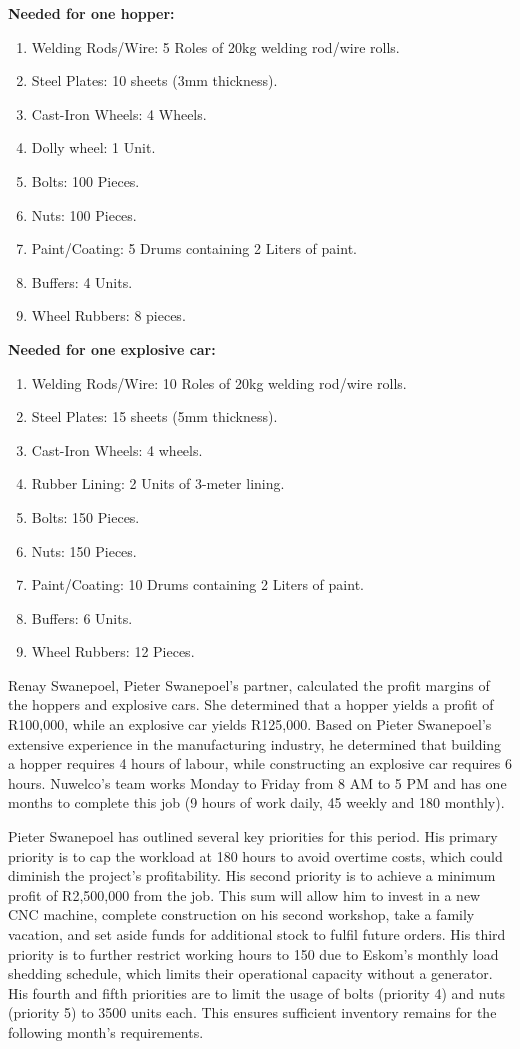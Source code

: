 \documentclass[a4paper,oneside,11pt]{book}
\begin{document}
\textbf{Needed for one hopper:}
\begin{enumerate}
    \item Welding Rods/Wire: 5 Roles of 20kg welding rod/wire rolls.
    \item Steel Plates: 10 sheets (3mm thickness).
    \item Cast-Iron Wheels: 4 Wheels.
    \item Dolly wheel: 1 Unit.
    \item Bolts: 100 Pieces.
    \item Nuts: 100 Pieces.
    \item Paint/Coating: 5 Drums containing 2 Liters of paint.
    \item Buffers: 4 Units.
    \item Wheel Rubbers: 8 pieces.
\end{enumerate}
\textbf{Needed for one explosive car:}
\begin{enumerate}
    \item Welding Rods/Wire: 10 Roles of 20kg welding rod/wire rolls.
    \item Steel Plates: 15 sheets (5mm thickness).
    \item Cast-Iron Wheels: 4 wheels.
    \item Rubber Lining: 2 Units of 3-meter lining.
    \item Bolts: 150 Pieces.
    \item Nuts: 150 Pieces.
    \item Paint/Coating: 10 Drums containing 2 Liters of paint.
    \item Buffers: 6 Units.
    \item Wheel Rubbers: 12 Pieces.
\end{enumerate}
Renay Swanepoel, Pieter Swanepoel's partner, calculated the profit margins of the hoppers and explosive cars. She determined that a hopper yields a profit of R100,000, while an explosive car yields R125,000. Based on Pieter Swanepoel's extensive experience in the manufacturing industry, he determined that building a hopper requires 4 hours of labour, while constructing an explosive car requires 6 hours. Nuwelco's team works Monday to Friday from 8 AM to 5 PM and has one months to complete this job (9 hours of work daily, 45 weekly and 180 monthly). 

Pieter Swanepoel has outlined several key priorities for this period. His primary priority is to cap the workload at 180 hours to avoid overtime costs, which could diminish the project's profitability. His second priority is to achieve a minimum profit of R2,500,000 from the job. This sum will allow him to invest in a new CNC machine, complete construction on his second workshop, take a family vacation, and set aside funds for additional stock to fulfil future orders. His third priority is to further restrict working hours to 150 due to Eskom's monthly load shedding schedule, which limits their operational capacity without a generator.  His fourth and fifth priorities are to limit the usage of bolts (priority 4) and nuts (priority 5) to 3500 units each. This ensures sufficient inventory remains for the following month's requirements.
\end{document}
